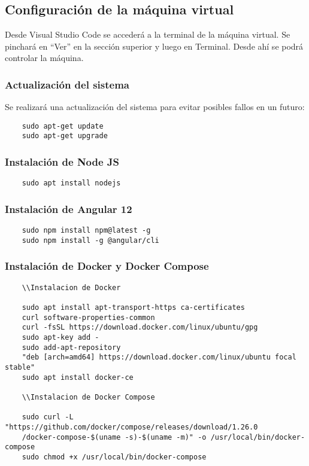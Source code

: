 \subsection{Configuración de la máquina virtual}

Desde Visual Studio Code se accederá a la terminal de la máquina virtual. Se pinchará en ``Ver'' en la sección superior y luego en Terminal. Desde ahí se podrá controlar la máquina.

\subsubsection{Actualización del sistema}
Se realizará una actualización del sistema para evitar posibles fallos en un futuro:
\begin{verbatim}
    sudo apt-get update
    sudo apt-get upgrade
\end{verbatim}

\subsubsection{Instalación de Node JS}
\begin{verbatim}
    sudo apt install nodejs
\end{verbatim}

\subsubsection{Instalación de Angular 12}
\begin{verbatim}
    sudo npm install npm@latest -g
    sudo npm install -g @angular/cli
\end{verbatim}

\subsubsection{Instalación de Docker y Docker Compose}
\begin{verbatim}
    \\Instalacion de Docker

    sudo apt install apt-transport-https ca-certificates
    curl software-properties-common
    curl -fsSL https://download.docker.com/linux/ubuntu/gpg
    sudo apt-key add -
    sudo add-apt-repository 
    "deb [arch=amd64] https://download.docker.com/linux/ubuntu focal stable"
    sudo apt install docker-ce

    \\Instalacion de Docker Compose

    sudo curl -L "https://github.com/docker/compose/releases/download/1.26.0
    /docker-compose-$(uname -s)-$(uname -m)" -o /usr/local/bin/docker-compose
    sudo chmod +x /usr/local/bin/docker-compose
\end{verbatim}

